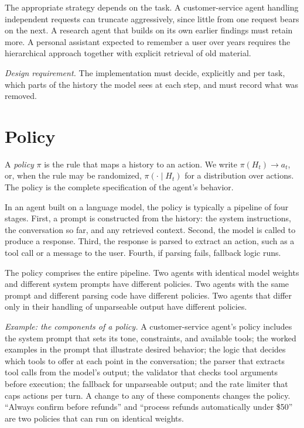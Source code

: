 \documentclass[11pt]{book}
\begin{document}
The appropriate strategy depends on the task. A customer-service agent handling independent requests can truncate aggressively, since little from one request bears on the next. A research agent that builds on its own earlier findings must retain more. A personal assistant expected to remember a user over years requires the hierarchical approach together with explicit retrieval of old material.

\textit{Design requirement.} The implementation must decide, explicitly and per task, which parts of the history the model sees at each step, and must record what was removed.

\section{Policy}

A \emph{policy} $\pi$ is the rule that maps a history to an action. We write $\pi(H_t) \rightarrow a_t$, or, when the rule may be randomized, $\pi(\cdot \mid H_t)$ for a distribution over actions. The policy is the complete specification of the agent's behavior.

In an agent built on a language model, the policy is typically a pipeline of four stages. First, a prompt is constructed from the history: the system instructions, the conversation so far, and any retrieved context. Second, the model is called to produce a response. Third, the response is parsed to extract an action, such as a tool call or a message to the user. Fourth, if parsing fails, fallback logic runs.

The policy comprises the entire pipeline. Two agents with identical model weights and different system prompts have different policies. Two agents with the same prompt and different parsing code have different policies. Two agents that differ only in their handling of unparseable output have different policies.

\textit{Example: the components of a policy.} A customer-service agent's policy includes the system prompt that sets its tone, constraints, and available tools; the worked examples in the prompt that illustrate desired behavior; the logic that decides which tools to offer at each point in the conversation; the parser that extracts tool calls from the model's output; the validator that checks tool arguments before execution; the fallback for unparseable output; and the rate limiter that caps actions per turn. A change to any of these components changes the policy. ``Always confirm before refunds'' and ``process refunds automatically under \$50'' are two policies that can run on identical weights.
\end{document}
